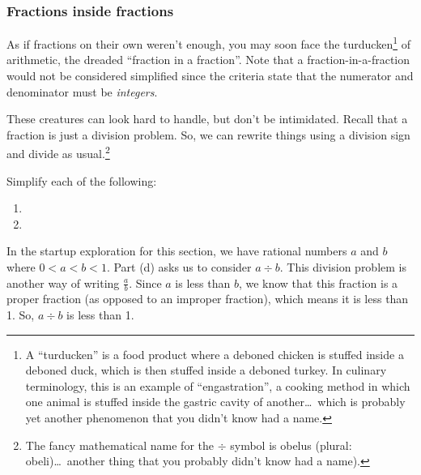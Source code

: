 \subsubsection{Fractions inside fractions}

As if fractions on their own weren't enough, you may soon face the \gls{turducken}\footnote{A ``turducken'' is a food product where a deboned chicken is stuffed inside a deboned duck, which is then stuffed inside a deboned turkey. In culinary terminology, this is an example of ``engastration'', a cooking method in which one animal is stuffed inside the gastric cavity of another\ldots\ which is probably yet another phenomenon that you didn't know had a name.} of arithmetic, the dreaded ``fraction in a fraction''. Note that a fraction-in-a-fraction would not be considered simplified since the criteria state that the numerator and denominator must be \textit{integers}.

These creatures can look hard to handle, but don't be intimidated. Recall that a fraction is just a division problem. So, we can rewrite things using a division sign and divide as usual.\footnote{The fancy mathematical name for the $\div$ symbol is \gls{obelus} (plural: obeli)\ldots\ another thing that you probably didn't know had a name).}

\begin{boxex}
Simplify each of the following:

\begin{enumerate}[itemsep=10pt]
\item {}

\item {}
\end{enumerate}
\end{boxex}

In the startup exploration for this section, we have rational numbers $a$ and $b$ where $0 < a < b < 1$. Part (d) asks us to consider $a \div b$. This division problem is another way of writing $\frac{a}{b}$. Since $a$ is less than $b$, we know that this fraction is a proper fraction (as opposed to an improper fraction), which means it is less than 1. So, $a \div b$ is less than 1.

